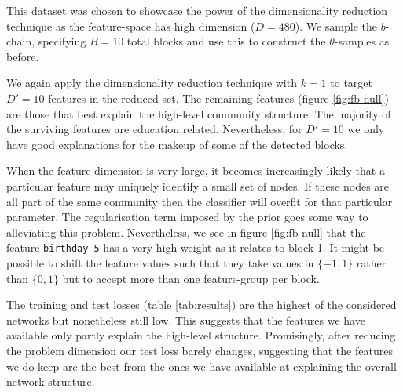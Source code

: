 This dataset was chosen to showcase the power of the dimensionality reduction technique as the feature-space has high dimension ($D=480$). We sample the $b$-chain, specifying $B=10$ total blocks and use this to construct the $\theta$-samples as before. 

We again apply the dimensionality reduction technique with $k=1$ to target $D'=10$ features in the reduced set. The remaining features (figure \ref{fig:fb-null}) are those that best explain the high-level community structure. The majority of the surviving features are education related. Nevertheless, for $D'=10$ we only have good explanations for the makeup of some of the detected blocks.

When the feature dimension is very large, it becomes increasingly likely that a particular feature may uniquely identify a small set of nodes. If these nodes are all part of the same community then the classifier will overfit for that particular parameter. The regularisation term imposed by the prior goes some way to alleviating this problem. Nevertheless, we see in figure \ref{fig:fb-null} that the feature \verb*|birthday-5| has a very high weight as it relates to block 1. It might be possible to shift the feature values such that they take values in $\{-1, 1\}$ rather than $\{0, 1\}$ but to accept more than one feature-group per block.

The training and test losses (table \ref{tab:results}) are the highest of the considered networks but nonetheless still low. This suggests that the features we have available only partly explain the high-level structure. Promisingly, after reducing the problem dimension our test loss barely changes, suggesting that the features we do keep are the best from the ones we have available at explaining the overall network structure. 

